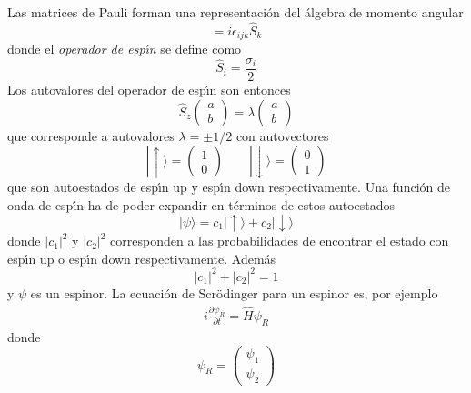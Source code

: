 \begin{subappendices}
Las matrices de Pauli forman una representaci\'on del \'algebra de momento angular
\begin{equation}
  [\hat S_i,\hat S_j]=i\epsilon_{ijk}\hat S_k
\end{equation}
donde el \emph{operador de esp\'\i n} se define como
\begin{equation}
  \hat S_i=\frac{\sigma_i}{2}
\end{equation}
Los autovalores del operador de esp\'\i n son entonces
\begin{equation}
  \hat S_z
  \begin{pmatrix}
    a\\
    b
  \end{pmatrix}=\lambda
  \begin{pmatrix}
    a\\
    b
  \end{pmatrix}
\end{equation}
que corresponde a autovalores $\lambda=\pm1/2$ con autovectores 
\begin{equation}
  |\uparrow\rangle=\begin{pmatrix}
    1\\
    0
  \end{pmatrix}\qquad
  |\downarrow\rangle=\begin{pmatrix}
    0\\
    1
  \end{pmatrix}
\end{equation}
que son autoestados de esp\'\i n up y esp\'\i n down respectivamente. Una funci\'on de onda de esp\'\i n ha de poder expandir en t\'erminos de estos autoestados
\begin{equation}
  |\psi\rangle=c_1|\uparrow\rangle+c_2|\downarrow\rangle
\end{equation}
donde $|c_1|^2$ y $|c_2|^2$ corresponden a las probabilidades de encontrar el estado con esp\'\i n up o esp\'\i n down respectivamente. Adem\'as
\begin{equation}
  |c_1|^2+|c_2|^2=1
\end{equation}
y $\psi$ es un espinor. La ecuaci\'on de Scr\"odinger para un espinor es, por ejemplo
\begin{align}
  i\frac{\partial\psi_R}{\partial t}=\widehat{H}\psi_R
\end{align}
donde
\begin{equation}
  \psi_R=
  \begin{pmatrix}
    \psi_1\\
    \psi_2
  \end{pmatrix}

\end{equation}
\end{subappendices}

